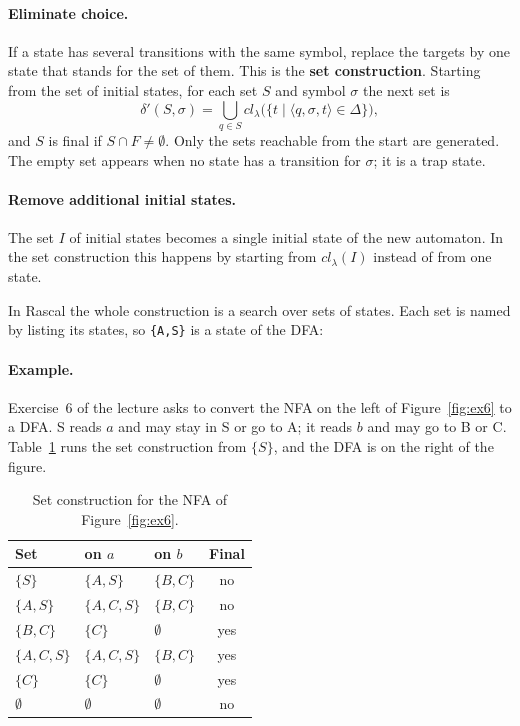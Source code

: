 \paragraph{Eliminate choice.} If a state has several transitions with the same
symbol, replace the targets by one state that stands for the set of them.
This is the \textbf{set construction}. Starting from the set of initial
states, for each set $S$ and symbol $\sigma$ the next set is
\[
  \delta'(S, \sigma) = \bigcup_{q \in S} \mathit{cl}_\lambda\big(\{ t \mid \langle q, \sigma, t \rangle \in \Delta \}\big),
\]
and $S$ is final if $S \cap F \ne \emptyset$. Only the sets reachable from the
start are generated. The empty set appears when no state has a transition for
$\sigma$; it is a trap state.

\paragraph{Remove additional initial states.} The set $I$ of initial states
becomes a single initial state of the new automaton. In the set construction
this happens by starting from $\mathit{cl}_\lambda(I)$ instead of from one
state.

In Rascal the whole construction is a search over sets of states. Each set
is named by listing its states, so \texttt{\{A,S\}} is a state of the DFA:

\paragraph{Example.} Exercise~6 of the lecture asks to convert the NFA on the
left of Figure~\ref{fig:ex6} to a DFA. S reads $a$ and may stay in S or go to
A; it reads $b$ and may go to B or C. Table~\ref{tab:ex6} runs the set
construction from $\{S\}$, and the DFA is on the right of the figure.

\begin{table}[h]
\centering
\small
\begin{tabular}{l l l c}
  \toprule
  Set & on $a$ & on $b$ & Final \\
  \midrule
  $\{S\}$       & $\{A, S\}$    & $\{B, C\}$ & no \\
  $\{A, S\}$    & $\{A, C, S\}$ & $\{B, C\}$ & no \\
  $\{B, C\}$    & $\{C\}$       & $\emptyset$ & yes \\
  $\{A, C, S\}$ & $\{A, C, S\}$ & $\{B, C\}$ & yes \\
  $\{C\}$       & $\{C\}$       & $\emptyset$ & yes \\
  $\emptyset$   & $\emptyset$   & $\emptyset$ & no \\
  \bottomrule
\end{tabular}
\caption{Set construction for the NFA of Figure~\ref{fig:ex6}.}
\label{tab:ex6}
\end{table}

